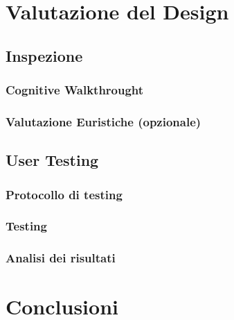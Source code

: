 \documentclass[../Report.tex]{subfiles}
\begin{document}
    \chapter{Valutazione del Design}
    \section{Inspezione}
    \subsection{Cognitive Walkthrought}
    \subsection{Valutazione Euristiche (opzionale)}
    \section{User Testing}
    \subsection{Protocollo di testing}
    \subsection{Testing}
    \subsection{Analisi dei risultati}

    \chapter{Conclusioni}
\end{document}
